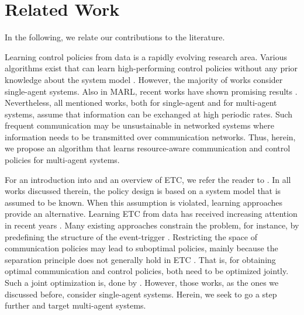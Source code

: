 \documentclass[12pt, final]{l4dc2023}
\begin{document}
\section{Related Work}

In the following, we relate our contributions to the literature.

Learning control policies from data is a rapidly evolving research area. 
Various algorithms exist that can learn high-performing control policies without any prior knowledge about the system model \citep{Lillicrap.10.09.2015,Duan.22.04.2016}.
However, the majority of works consider single-agent systems.
Also in MARL, recent works have shown promising results \citep{zhang2021multi, Yu.2020, Tang.25.09.2018,Shu.29.09.2018,Gupta.2017,Lowe.2017}. 
Nevertheless, all mentioned works, both for single-agent and for multi-agent systems, assume that information can be exchanged at high periodic rates.
Such frequent communication may be unsustainable in networked systems where information needs to be transmitted over communication networks.
Thus, herein, we propose an algorithm that learns resource-aware communication and control policies for multi-agent systems.

For an introduction into and an overview of ETC, we refer the reader to \cite{heemels2012introduction,miskowicz15event}.
In all works discussed therein, the policy design is based on a system model that is assumed to be known.
When this assumption is violated, learning approaches provide an alternative.
Learning ETC from data has received increasing attention in recent years \citep{Sedghi.2022}. 
Many existing approaches constrain the problem, for instance, by predefining the structure of the event-trigger \citep{Vamvoudakis.2018,zhong2014event,yang2017event,Sahoo.2016}.
Restricting the space of communication policies may lead to suboptimal policies, mainly because the separation principle does not generally hold in ETC \citep{ramesh2011dual}.
That is, for obtaining optimal communication and control policies, both need to be optimized jointly.
Such a joint optimization is, \eg done by \cite{baumann2018deep, Hashimoto.2021,funk2021learning}. %
However, those works, as the ones we discussed before, consider single-agent systems. 
Herein, we seek to go a step further and target multi-agent systems.
\end{document}
